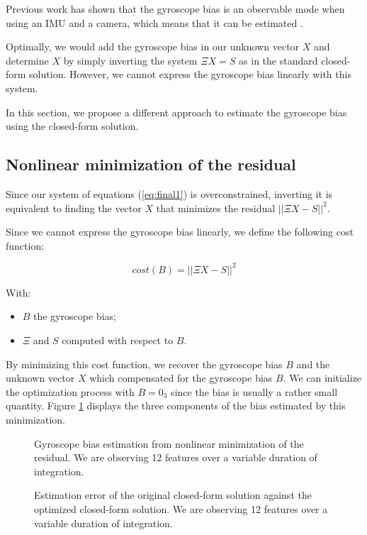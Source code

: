 \documentclass[letterpaper, 10 pt, conference]{ieeeconf}  %
\begin{document}
Previous work has shown that the gyroscope bias is an observable mode when using an IMU and a camera, which means that it can be estimated \cite{Martinelli2012}.

Optimally, we would add the gyroscope bias in our unknown vector $X$ and determine $X$ by simply inverting the system $\Xi X = S$ as in the standard closed-form solution.
However, we cannot express the gyroscope bias linearly with this system.

In this section, we propose a different approach to estimate the gyroscope bias using the closed-form solution.

\subsection{Nonlinear minimization of the residual}

Since our system of equations (\ref{eq:final1}) is overconstrained,
inverting it is equivalent to finding the vector $X$ that minimizes the residual $||\Xi X - S||^2$.

Since we cannot express the gyroscope bias linearly,
we define the following cost function:

\begin{equation}
  \label{eq:cost}
  cost(B) = ||\Xi X - S||^2
\end{equation}

With:
\begin{itemize}
\item $B$ the gyroscope bias;
\item $\Xi$ and $S$ computed with respect to $B$.
\end{itemize}

By minimizing this cost function, we recover the gyroscope bias $B$ and the unknown vector $X$ which compensated for the gyroscope bias $B$.
We can initialize the optimization process with $B = 0_3$ since the bias is usually a rather small quantity. Figure \ref{fig:gBiasEstimate} displays the three components of the bias estimated by this minimization.

\begin{figure}
  \centering
  \resizebox{0.7\columnwidth}{!}{}
  \caption{Gyroscope bias estimation from nonlinear minimization of the residual. We are observing 12 features  over a variable duration of integration. \label{fig:gBiasEstimate}}
\end{figure}

\begin{figure}
   \centering
   \resizebox{0.7\columnwidth}{!}{}
                \caption{Estimation error of the original closed-form solution against the optimized closed-form solution.  We are observing 12 features  over a variable duration of integration. \label{fig:optEstimate}}
\end{figure}
\end{document}
